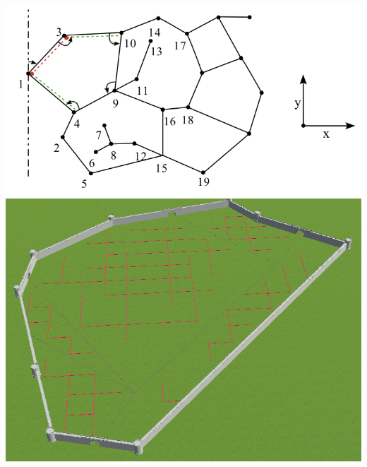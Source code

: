   
\begin{center}
  \includegraphics[height = 7 cm]{images/MCB.png}\\
  \includegraphics[height = 7 cm]{images/routeprimaireetsecondaire.png}\\
\end{center}

